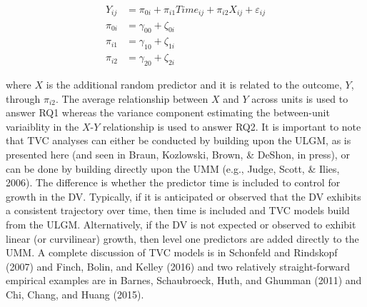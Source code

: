 \documentclass[english,,man]{apa6}
\theoremstyle{definition}
\theoremstyle{definition}
\theoremstyle{definition}
\theoremstyle{remark}
\begin{document}
\begin{align}
\label{ULGM}
Y_{ij} &= \pi_{0i} + \pi_{i1}Time_{ij} + \pi_{i2}X_{ij} + \varepsilon_{ij} \\
\pi_{0i} &= \gamma_{00} + \zeta_{0i} \\
\pi_{i1} &= \gamma_{10} + \zeta_{1i} \\
\pi_{i2} &= \gamma_{20} + \zeta_{2i}
\end{align}

\noindent \noindent where \(X\) is the additional random predictor and
it is related to the outcome, \(Y\), through \(\pi_{i2}\). The average
relationship between \(X\) and \(Y\) across units is used to answer RQ1
whereas the variance component estimating the between-unit variaiblity
in the \(X\)-\(Y\) relationship is used to answer RQ2. It is important
to note that TVC analyses can either be conducted by building upon the
ULGM, as is presented here (and seen in Braun, Kozlowski, Brown, \&
DeShon, in press), or can be done by building directly upon the UMM
(e.g., Judge, Scott, \& Ilies, 2006). The difference is whether the
predictor time is included to control for growth in the DV. Typically,
if it is anticipated or observed that the DV exhibits a consistent
trajectory over time, then time is included and TVC models build from
the ULGM. Alternatively, if the DV is not expected or observed to
exhibit linear (or curvilinear) growth, then level one predictors are
added directly to the UMM. A complete discussion of TVC models is in
Schonfeld and Rindskopf (2007) and Finch, Bolin, and Kelley (2016) and
two relatively straight-forward empirical examples are in Barnes,
Schaubroeck, Huth, and Ghumman (2011) and Chi, Chang, and Huang (2015).
\end{document}
